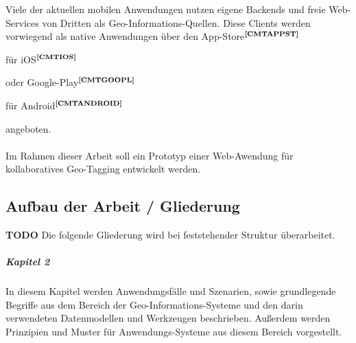 Viele der aktuellen mobilen Anwendungen nutzen eigene Backends und freie Web-Services von Dritten als Geo-Informations-Quellen. Diese Clients werden vorwiegend als native Anwendungen über den App-Store$^{\textbf{\ref{CMTAPPST}}}$%
\addtocounter{footnote}{1}%
 für iOS$^{\textbf{\ref{CMTIOS}}}$%
\addtocounter{footnote}{1}%
 oder Google-Play$^{\textbf{\ref{CMTGOOPL}}}$%
\addtocounter{footnote}{1}%
 für Android$^{\textbf{\ref{CMTANDROID}}}$%
\addtocounter{footnote}{1}%
 angeboten.%
 \\ \\
Im Rahmen dieser Arbeit soll ein Prototyp einer Web-Awendung für kollaboratives Geo-Tagging entwickelt werden.%

\subsection{Aufbau der Arbeit / Gliederung}

\textbf{TODO} Die folgende Gliederung wird bei feststehender Struktur überarbeitet.\\
\noindent
\subparagraph{Kapitel 2}
In diesem Kapitel werden Anwendungsfälle und Szenarien, sowie grundlegende Begriffe aus dem Bereich der Geo-Informations-Systeme und den darin verwendeten Datenmodellen und Werkzeugen beschrieben. Außerdem werden Prinzipien und Muster für Anwendungs-Systeme aus diesem Bereich vorgestellt. 

